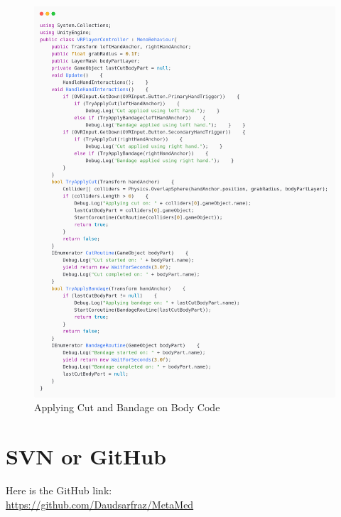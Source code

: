 \begin{figure}[h] 
	\centering
	\includegraphics[width=1\textwidth, height=0.7\textheight]{Images/Applying Cut and Bandage on Body.png}
	\caption{Applying Cut and Bandage on Body Code}
	\label{fig:Hands Washing}
\end{figure}
\newpage
\section{SVN or GitHub}
 Here is the GitHub link: \\
\href{https://github.com/Daudsarfraz/MetaMed}{https://github.com/Daudsarfraz/MetaMed}